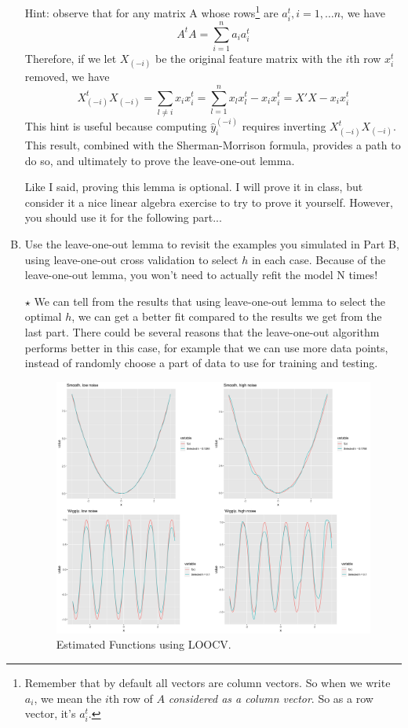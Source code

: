 \documentclass[11pt]{article}
\newcommand{\jie}{$\star$ }
\begin{document}
\begin{enumerate}[(A)]
Hint: observe that for any matrix A whose rows\footnote{Remember that by default all vectors are column vectors. So when we write $a_i$, we mean the $i$th row of $A$ \emph{considered as a column vector}.  So as a row vector, it's $a_i^t$.} are $a_i^t, i = 1, \ldots n$, we have
$$
A^t A = \sum_{i=1}^n a_i a_i^t
$$
Therefore, if we let $X_{(-i)}$ be the original feature matrix with the $i$th row $x_i^t$ removed, we have
$$
X_{(-i)}^t X_{(-i)} = \sum_{l \neq i} x_i x_i^t = \sum_{l=1}^n x_l x_l^t  - x_i x_i^t = X'X - x_i x_i^t
$$
 This hint is useful because computing $\hat{y}_{i}^{(-i)}$ requires inverting $X_{(-i)}^t X_{(-i)}$.  This result, combined with the Sherman-Morrison formula, provides a path to do so, and ultimately to prove the leave-one-out lemma.  

Like I said, proving this lemma is optional. I will prove it in class, but consider it a nice linear algebra exercise to try to prove it yourself.  However, you should use it for the following part...

\item Use the leave-one-out lemma to revisit the examples you simulated in Part B, using leave-one-out cross validation to select $h$ in each case.  Because of the leave-one-out lemma, you won't need to actually refit the model N times!  

\bigskip \jie
We can tell from the results that using leave-one-out lemma to select the optimal $h$, we can get a better fit compared to the results we get from the last part. There could be several reasons that the leave-one-out algorithm performs better in this case, for example that we can use more data points, instead of randomly choose a part of data to use for training and testing.

\begin{figure}[h]
    \centering
    \includegraphics[width=\textwidth]{Ex6/figures/crossva_LOO.png}
    \caption{Estimated Functions using LOOCV.}
\end{figure}

\end{enumerate}
\end{document}
